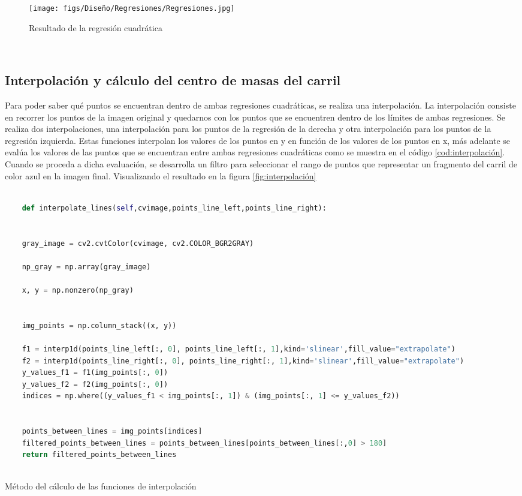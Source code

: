 \begin{figure} [H]
  \begin{center}
    \texttt{[image: figs/Diseño/Regresiones/Regresiones.jpg]}
  \end{center}
  \caption{Resultado de la regresión cuadrática}
  \label{fig:regresión cuadrática}
\end{figure}\

\subsection{Interpolación y cálculo del centro de masas del carril}
\label{sec:Interpolación y cálculo del centro de masas del carril}

Para poder saber qué puntos se encuentran dentro de ambas regresiones cuadráticas, se realiza una interpolación. La interpolación consiste en recorrer
los puntos de la imagen original y quedarnos con los puntos que se encuentren dentro de los límites de ambas regresiones. Se realiza dos interpolaciones, una interpolación para 
los puntos de la regresión de la  derecha
y otra interpolación para los puntos de la regresión izquierda. Estas funciones interpolan los valores de los puntos en y en función de los valores de los puntos en x, más adelante se evalúa los valores de las puntos que se encuentran entre 
ambas regresiones cuadráticas como se muestra en el código \ref{cod:interpolación}. Cuando se proceda a dicha evaluación, se desarrolla un filtro para seleccionar el rango de puntos que representar un fragmento del carril de color azul en la imagen
final. Visualizando el resultado en la figura \ref{fig:interpolación} \newline

\begin{code}[h]
  \begin{lstlisting}[language=Python]

    def interpolate_lines(self,cvimage,points_line_left,points_line_right):


    gray_image = cv2.cvtColor(cvimage, cv2.COLOR_BGR2GRAY) 

    np_gray = np.array(gray_image)

    x, y = np.nonzero(np_gray)


    img_points = np.column_stack((x, y))

    f1 = interp1d(points_line_left[:, 0], points_line_left[:, 1],kind='slinear',fill_value="extrapolate")
    f2 = interp1d(points_line_right[:, 0], points_line_right[:, 1],kind='slinear',fill_value="extrapolate") 
    y_values_f1 = f1(img_points[:, 0])
    y_values_f2 = f2(img_points[:, 0])
    indices = np.where((y_values_f1 < img_points[:, 1]) & (img_points[:, 1] <= y_values_f2))
    
    
    points_between_lines = img_points[indices]
    filtered_points_between_lines = points_between_lines[points_between_lines[:,0] > 180]
    return filtered_points_between_lines
    

  \end{lstlisting}
  \caption[Método de interpolación]{Método del cálculo de las funciones de interpolación}
  \label{cod:interpolación}
  \end{code}  



